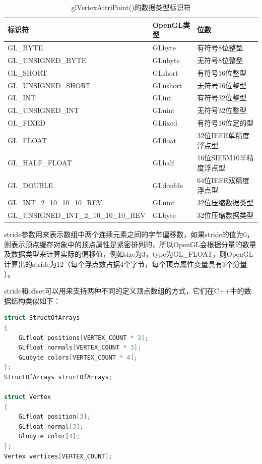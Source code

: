 \begin{table}
\caption{glVertexAttriPoint()的数据类型标识符}
\label{t:api-glVertexAttribPointer-type}
\centering
\begin{tabular}{>{\small}p{}|>{\small}p{}|>{\small}p{}}
\hline 
   标识符 & OpenGL类型 & 位数  \\
    \hline  
  GL\_BYTE  							&GLbyte   & 有符号8位整型\\
  GL\_UNSIGNED\_BYTE  					&GLubyte  & 无符号8位整型\\
  GL\_SHORT  							&GLshort  & 有符号16位整型\\
  GL\_UNSIGNED\_SHORT  					&GLushort & 无符号16位整型\\
  GL\_INT  								&GLint    & 有符号32位整型\\
  GL\_UNSIGNED\_INT  					&GLuint   & 无符号32位整型\\
  GL\_FIXED  							&GLfixed  & 有符号16位定的型\\
  GL\_FLOAT                             &GLfloat  & 32位IEEE单精度浮点型\\
  GL\_HALF\_FLOAT                       &GLhalf   & 16位SIE5M10半精度浮点型\\
  GL\_DOUBLE                            &GLdouble & 64位IEEE双精度浮点型\\
  GL\_INT\_2\_10\_10\_10\_REV           &GLuint   & 32位压缩数据类型\\
  GL\_UNSIGNED\_INT\_2\_10\_10\_10\_REV &GLbyte   & 32位压缩数据类型\\


 \hline 
\end{tabular}
\end{table}

stride参数用来表示数组中两个连续元素之间的字节偏移数，如果stride的值为0，则表示顶点缓存对象中的顶点属性是紧密排列的，所以OpenGL会根据分量的数量及数据类型来计算实际的偏移值，例如size为3，type为GL\_FLOAT，则OpenGL计算出的stride为12（每个浮点数占据4个字节，每个顶点属性变量具有3个分量 ）。

stride和offset可以用来支持两种不同的定义顶点数组的方式，它们在C++中的数据结构类似如下：

\begin{lstlisting}[language=C++]
struct StructOfArrays
{
	GLfloat positions[VERTEX_COUNT * 3];
  	GLfloat normals[VERTEX_COUNT * 3];
  	GLubyte colors[VERTEX_COUNT * 4];
};
StructOfArrays structOfArrays;

struct Vertex
{
	GLfloat position[3];
  	GLfloat normal[3];
  	Glubyte color[4];
};
Vertex vertices[VERTEX_COUNT];
\end{lstlisting}

